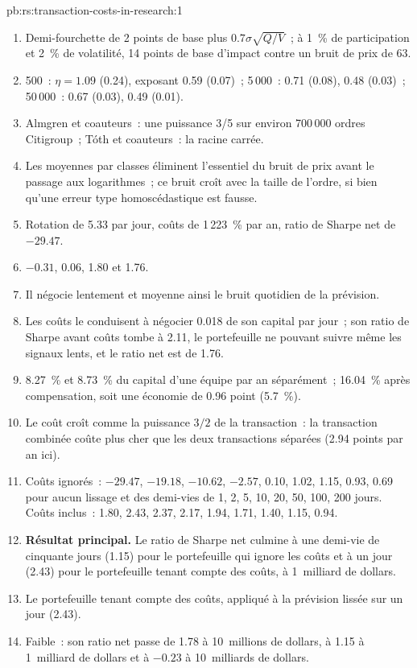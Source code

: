 \begin{solution}{pb:rs:transaction-costs-in-research:1}
\begin{enumerate}
\item Demi-fourchette de 2 points de base plus $0.7\sigma\sqrt{Q/V}$~; à 1~\% de participation et 2~\% de volatilité, 14 points de base d'impact contre un bruit de prix de 63.
\item 500~: $\eta = 1.09$ (0.24), exposant 0.59 (0.07)~; 5\,000~: 0.71 (0.08), 0.48 (0.03)~; 50\,000~: 0.67 (0.03), 0.49 (0.01).
\item Almgren et coauteurs~: une puissance 3/5 sur environ 700\,000 ordres Citigroup~; Tóth et coauteurs~: la racine carrée.
\item Les moyennes par classes éliminent l'essentiel du bruit de prix avant le passage aux logarithmes~; ce bruit croît avec la taille de l'ordre, si bien qu'une erreur type homoscédastique est
fausse.
\item Rotation de 5.33 par jour, coûts de 1\,223~\% par an, ratio de Sharpe net de $-29.47$.
\item $-0.31$, 0.06, 1.80 et 1.76.
\item Il négocie lentement et moyenne ainsi le bruit quotidien de la prévision.
\item Les coûts le conduisent à négocier 0.018 de son capital par jour~; son ratio de Sharpe avant coûts tombe à 2.11, le portefeuille ne pouvant suivre même les signaux lents, et le ratio net est de 1.76.
\item 8.27~\% et 8.73~\% du capital d'une équipe par an séparément~; 16.04~\% après compensation, soit une économie de 0.96 point (5.7~\%).
\item Le coût croît comme la puissance $3/2$ de la transaction~: la transaction combinée coûte plus cher que les deux transactions séparées (2.94 points par an ici).
\item Coûts ignorés~: $-29.47$, $-19.18$, $-10.62$, $-2.57$, 0.10, 1.02, 1.15, 0.93, 0.69 pour aucun lissage et des demi-vies de 1, 2, 5, 10, 20, 50, 100, 200 jours. Coûts
inclus~: 1.80, 2.43, 2.37, 2.17, 1.94, 1.71, 1.40, 1.15, 0.94.
\item \textbf{Résultat principal.} Le ratio de Sharpe net culmine à une demi-vie de cinquante jours (1.15) pour le portefeuille qui ignore les coûts et à un jour (2.43) pour le
portefeuille tenant compte des coûts, à 1~milliard de dollars.
\item Le portefeuille tenant compte des coûts, appliqué à la prévision lissée sur un jour (2.43).
\item Faible~: son ratio net passe de 1.78 à 10~millions de dollars, à 1.15 à 1~milliard de dollars et à $-0.23$ à 10~milliards de dollars.

\end{enumerate}
\end{solution}
